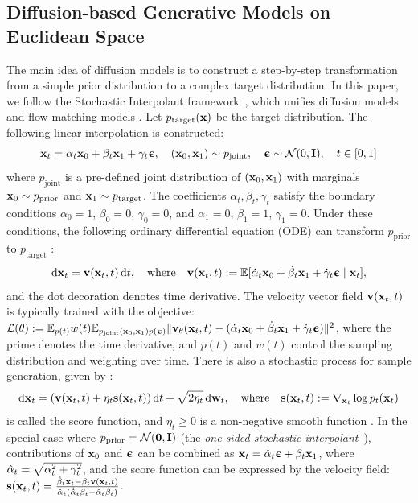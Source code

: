 \documentclass{article} %
\newcommand{\prior}{\mathrm{prior}}
\newcommand{\target}{\mathrm{target}}
\newcommand{\joint}{\mathrm{joint}}
\newcommand{\alphahd}{\dot{\alphah}}
\begin{document}
\subsection{Diffusion-based Generative Models on Euclidean Space}\label{sec:euclidean-diffusion}
The main idea of diffusion models is to construct a step-by-step transformation from a simple prior distribution to a complex target distribution. 
In this paper, we follow the Stochastic Interpolant framework~\citep{albergo2023stochastic}, which unifies diffusion models and flow matching models \citep{lipman2023flow,liu2023flow}.
Let $p_\target(\bfxx)$ be the target distribution.
The following linear interpolation is constructed:
\begin{align}\label{eqn:euclidean-dp}
    \bfxx_t = \alpha_t \bfxx_0 + \beta_t\bfxx_1+ \gamma_t \bfeps, \quad (\bfxx_0,\bfxx_1)\sim p_\joint,  \quad\bfeps \sim \clN(0, \bfI), \quad t\in[0,1]
\end{align}
where $p_\joint$ is a pre-defined joint distribution of $(\mathbf{x}_0,\mathbf{x}_1)$ with marginals $\bfxx_0 \sim p_\prior$ and $\bfxx_1 \sim p_\target$.
The coefficients $\alpha_t,\beta_t,\gamma_t$ satisfy the boundary conditions $\alpha_0 = 1$, $\beta_0 = 0$, %
$\gamma_0 = 0$, and $\alpha_1 = 0$, $\beta_1 = 1$, $\gamma_1 = 0$.
Under these conditions, the following ordinary differential equation (ODE) can transform $p_\prior$ to $p_\target$ \citep[Cor.~2.18]{albergo2023stochastic}:
\begin{align}\label{eqn:diffusion-ode}
    \mathrm{d} \mathbf{x}_t = \mathbf{v}(\mathbf{x}_t,t) \,\mathrm{d} t, \quad
    \text{where}\quad\mathbf{v}(\mathbf{x}_t,t):=\mathbb{E}[\dot{\alpha}_t \mathbf{x}_0 + \dot{\beta}_t\mathbf{x}_1+ \dot{\gamma}_t {\bm{\upepsilon}}\mid\mathbf{x}_t],
\end{align}
and the dot decoration denotes time derivative.
The velocity vector field $\mathbf{v}(\mathbf{x}_t,t)$ is typically 
trained with the objective:
    $\clL(\theta):=\bbE_{p(t)} w(t) \bbE_{p_\joint(\bfxx_0,\bfxx_1) p(\bfeps)} \Vert\bfvv_\theta(\bfxx_t,t)-(\alphad_t \bfxx_0 + \betad_t\bfxx_1+ \gammad_t \bfeps)\Vert^2$,
where the prime denotes the time derivative, and $p(t)$ and $w(t)$ control the sampling distribution and weighting over time. 
There is also a stochastic process for sample generation, given by :
\begin{align}\label{eqn:diffusion-sde}
    \mathrm{d}\mathbf{x}_t = \left(\mathbf{v}(\mathbf{x}_t,t) + \eta_t \mathbf{s}(\mathbf{x}_t,t)\right)\mathrm{d} t + \sqrt{2\eta_t} \,\mathrm{d} \mathbf{w}_t, \quad\text{where} \quad\mathbf{s}(\mathbf{x}_t,t) := \nabla_{\mathbf{x}_t} \log p_t(\mathbf{x}_t)
\end{align}
is called the score function, and $\eta_t\geq0$ is a non-negative smooth function \citep[Cor.~2.10]{albergo2023stochastic}. 
In the special case where $p_\prior = \clN(\bfzro, \bfI)$ (the \emph{one-sided stochastic interpolant}~\citep[Def.~3.4]{albergo2023stochastic}), contributions of $\mathbf{x}_0$ and ${\bm{\upepsilon}}$ can be combined as $\mathbf{x}_t=\hat{\alpha}_t{\bm{\upepsilon}}+\beta_t\mathbf{x}_1$, where $\hat{\alpha}_t=\sqrt{\alpha_t^2+\gamma_t^2}$, and the score function can be expressed by the velocity field:
$\bfss(\bfxx_t,t) = \frac{\betad_t\bfxx_t-\beta_t\bfvv(\bfxx_t,t)}{\alphah_t(\alphahd_t\beta_t-\alphah_t\betad_t)}$.
\end{document}
